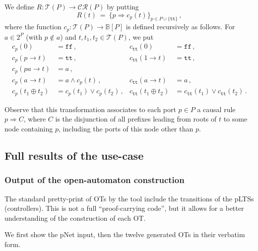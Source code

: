 \documentclass{llncs}
\newcommand{\sB}{\ensuremath{\mathbb{B}}}
\newcommand{\true} {\ensuremath{\mathtt{t\!t}}}
\newcommand{\false}{\ensuremath{\mathtt{f\!f}}}
\newcommand{\ct}{\ensuremath{\mathcal{T}}}
\newcommand{\cru}{\ensuremath{\mathcal{CR}}}
\begin{document}
We define $R: \ct(P) \rightarrow \cru(P)$ by putting
%
\begin{equation} 
  \label{eq:trees2rules}
  R(t)\ =\ \{p \Rightarrow c_p(t)\}_{p\in P\cup\{\true\}}\,,
\end{equation}
where the function $c_p : \ct(P) \rightarrow \sB[P]$ is defined recursively
as follows.  For $a\in 2^P$ (with $p\not\in a$) and $t,t_1,t_2 \in \ct(P)$,
we put
%
\begin{align*}
  c_p(0) & = \false\,, 
  & c_{\true}(0) & = \false\,,\\
  c_p(p \rightarrow t) & = \true\,,
  & c_{\true}(1 \rightarrow t) & = \true\,,\\
  c_p(pa \rightarrow t) & = a\,,\\
  c_p(a \rightarrow t) & = a \land c_p(t)\,,
  & c_{\true}(a \rightarrow t) & = a\,,\\
  c_p(t_1 \oplus t_2) & = c_p(t_1) \lor c_p(t_2)\,, 
  & c_{\true}(t_1 \oplus t_2) & = c_{\true}(t_1) \lor c_{\true}(t_2)\,.
\end{align*}

Observe that this transformation associates to each port $p \in P$ a
causal rule $p \Rightarrow C$, where $C$ is the disjunction of all
prefixes leading from roots of $t$ to some node containing $p$,
including the ports of this node other than $p$.

\subsection{Full results of the use-case}
\label{secn:full-results}

\subsubsection{Output of the open-automaton construction}
The standard pretty-print of OTs by the tool include the transitions
of the pLTSs (controllers). This is not a full ``proof-carrying
code'', but it allows for a better understanding of the construction
of each OT.

We first show the pNet input, then the twelve generated OTs in their
verbatim form.
\end{document}
